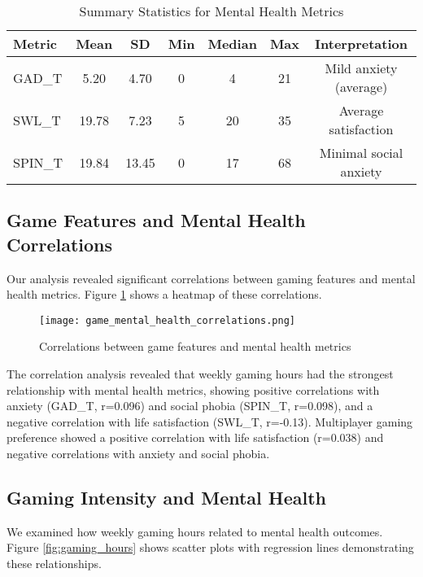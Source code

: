 \documentclass[12pt]{article}
\begin{document}
\begin{table}[h]
\centering
\caption{Summary Statistics for Mental Health Metrics}
\label{tab:mental_health_summary}
\begin{tabular}{lcccccc}
\toprule
\textbf{Metric} & \textbf{Mean} & \textbf{SD} & \textbf{Min} & \textbf{Median} & \textbf{Max} & \textbf{Interpretation} \\
\midrule
GAD\_T & 5.20 & 4.70 & 0 & 4 & 21 & Mild anxiety (average) \\
SWL\_T & 19.78 & 7.23 & 5 & 20 & 35 & Average satisfaction \\
SPIN\_T & 19.84 & 13.45 & 0 & 17 & 68 & Minimal social anxiety \\
\bottomrule
\end{tabular}
\end{table}

\subsection{Game Features and Mental Health Correlations}

Our analysis revealed significant correlations between gaming features and mental health metrics. Figure \ref{fig:correlations} shows a heatmap of these correlations.

\begin{figure}[H]
\centering
\texttt{[image: game\_mental\_health\_correlations.png]}
\caption{Correlations between game features and mental health metrics}
\label{fig:correlations}
\end{figure}
\noindent
The correlation analysis revealed that weekly gaming hours had the strongest relationship with mental health metrics, showing positive correlations with anxiety (GAD\_T, r=0.096) and social phobia (SPIN\_T, r=0.098), and a negative correlation with life satisfaction (SWL\_T, r=-0.13). Multiplayer gaming preference showed a positive correlation with life satisfaction (r=0.038) and negative correlations with anxiety and social phobia.

\subsection{Gaming Intensity and Mental Health}

We examined how weekly gaming hours related to mental health outcomes. Figure \ref{fig:gaming_hours} shows scatter plots with regression lines demonstrating these relationships.
\end{document}
